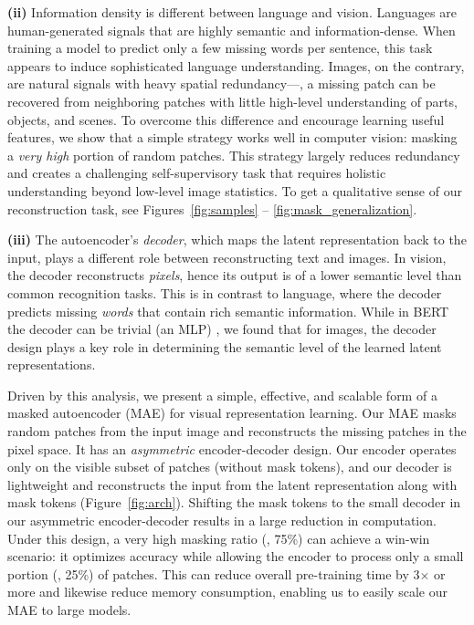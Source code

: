 \documentclass[10pt,twocolumn,letterpaper]{article}
\newcommand{\x}{{\times}}
\begin{document}
\textbf{(ii)} Information density is different between language and vision. Languages are human-generated signals that are highly semantic and information-dense. When training a model to predict only a few missing words per sentence, this task appears to induce sophisticated language understanding. Images, on the contrary, are natural signals with heavy spatial redundancy---\eg, a missing patch can be recovered from neighboring patches with little high-level understanding of parts, objects, and scenes. To overcome this difference and encourage learning useful features, we show that a simple strategy works well in computer vision: masking a \textit{very high} portion of random patches. This strategy largely reduces redundancy and creates a challenging self-supervisory task that requires holistic understanding beyond low-level image statistics. To get a qualitative sense of our reconstruction task, see Figures~\ref{fig:samples} -- \ref{fig:mask_generalization}.

\textbf{(iii)} The autoencoder's \textit{decoder}, which maps the latent representation back to the input, plays a different role between reconstructing text and images. In vision, the decoder reconstructs \emph{pixels}, hence its output is of a lower \mbox{semantic} level than common recognition tasks. This is in contrast to language, where the decoder predicts missing \emph{words} that contain rich semantic information. While in BERT the decoder can be trivial (an MLP) \cite{Devlin2019}, we found that for images, the decoder design plays a key role in determining the semantic level of the learned latent representations.

Driven by this analysis, we present a simple, effective, and scalable form of a masked autoencoder (MAE) for visual representation learning. Our MAE masks random patches from the input image and reconstructs the missing patches in the pixel space. It has an \textit{asymmetric} encoder-decoder design. Our encoder operates only on the visible subset of patches (without mask tokens), and our decoder is lightweight and reconstructs the input from the latent representation along with mask tokens (Figure~\ref{fig:arch}). Shifting the mask tokens to the small decoder in our asymmetric encoder-decoder results in a large reduction in computation. Under this design, a very high masking ratio (\eg, 75\%) can achieve a win-win scenario: it optimizes accuracy while allowing the encoder to process only a small portion (\eg, 25\%) of patches. This can reduce overall pre-training time by 3$\x$ or more and likewise reduce memory consumption, enabling us to easily scale our MAE to large models.
\end{document}
